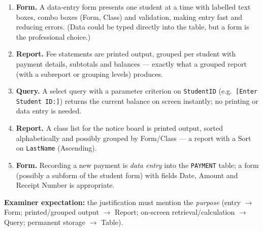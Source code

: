 \documentclass[11pt]{article}
\begin{document}
\begin{corrige}
\begin{enumerate}
\item \textbf{Form.} A data-entry form presents one student at a time with labelled text boxes, combo boxes (Form, Class) and validation, making entry fast and reducing errors. (Data could be typed directly into the table, but a form is the professional choice.)
\item \textbf{Report.} Fee statements are printed output, grouped per student with payment details, subtotals and balances --- exactly what a grouped report (with a subreport or grouping levels) produces.
\item \textbf{Query.} A select query with a parameter criterion on \texttt{StudentID} (e.g.\ \texttt{[Enter Student ID:]}) returns the current balance on screen instantly; no printing or data entry is needed.
\item \textbf{Report.} A class list for the notice board is printed output, sorted alphabetically and possibly grouped by Form/Class --- a report with a Sort on \texttt{LastName} (Ascending).
\item \textbf{Form.} Recording a new payment is \emph{data entry} into the \texttt{PAYMENT} table; a form (possibly a subform of the student form) with fields Date, Amount and Receipt Number is appropriate.
\end{enumerate}
\textbf{Examiner expectation:} the justification must mention the \emph{purpose} (entry $\rightarrow$ Form; printed/grouped output $\rightarrow$ Report; on-screen retrieval/calculation $\rightarrow$ Query; permanent storage $\rightarrow$ Table).
\end{corrige}
\end{document}

